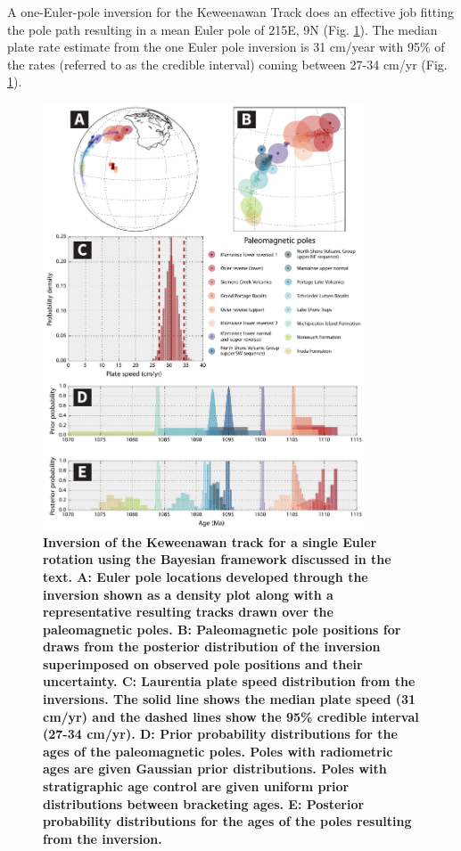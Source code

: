 \documentclass[11pt,letterpaper]{article}
\begin{document}
A one-Euler-pole inversion for the Keweenawan Track does an effective job fitting the pole path resulting in a mean Euler pole of 215\textdegree E, 9\textdegree N (Fig. \ref{fig:bayesian_1_euler}). The median plate rate estimate from the one Euler pole inversion is 31 cm/year with 95$\%$ of the rates (referred to as the credible interval) coming between 27-34 cm/yr (Fig. \ref{fig:bayesian_1_euler}).

\begin{figure}
\begin{centering}
\includegraphics[width=0.85\textwidth]{Figures/Fig10_bayesian_1_euler.pdf}
\caption{\small{\textbf{Inversion of the Keweenawan track for a single Euler rotation using the Bayesian framework discussed in the text. A: Euler pole locations developed through the inversion shown as a density plot along with a representative resulting tracks drawn over the paleomagnetic poles. B: Paleomagnetic pole positions for draws from the posterior distribution of the inversion superimposed on observed pole positions and their uncertainty. C: Laurentia plate speed distribution from the inversions. The solid line shows the median plate speed (31 cm/yr) and the dashed lines show the 95\% credible interval (27-34 cm/yr). D: Prior probability distributions for the ages of the paleomagnetic poles. Poles with radiometric ages are given Gaussian prior distributions. Poles with stratigraphic age control are given uniform prior distributions between bracketing ages. E: Posterior probability distributions for the ages of the poles resulting from the inversion.}}}
\label{fig:bayesian_1_euler}
\end{centering}
\end{figure}
\end{document}
